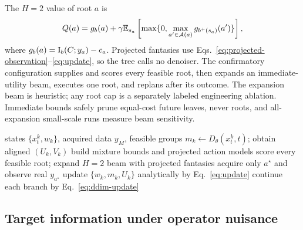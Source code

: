 The $H=2$ value of root $a$ is
\begin{equation}
 Q(a)=g_b(a)+\gamma\mathbb{E}_{s_a}
 \left[\max\{0,\max_{a'\in\mathcal A(a)}g_{b^+(s_a)}(a')\}\right],
 \label{eq:h2}
\end{equation}
where $g_b(a)=\mathrm{I}_b(C;y_a)-c_a$.  Projected fantasies use
Eqs.~\eqref{eq:projected-observation}--\eqref{eq:update}, so the tree calls no
denoiser.  The confirmatory configuration supplies and scores every feasible
root, then expands an immediate-utility beam, executes one root, and replans
after its outcome.  The expansion beam is heuristic; any root cap is a
separately labeled engineering ablation.  Immediate bounds safely prune
equal-cost future leaves, never roots, and all-expansion small-scale runs
measure beam sensitivity.

\begin{algorithm}[t]
\caption{\method{} at one acquisition checkpoint}
\label{alg:raosense}
\begin{algorithmic}[1]\footnotesize
\Require states $\{x_t^k,w_k\}$, acquired data $y_M$, feasible groups
  \State $m_k\gets D_\theta(x_t^k,t)$; obtain aligned $(U_k,V_k)$
\EndFor
\State build mixture bounds and projected action models
\State score every feasible root; expand $H=2$ beam with projected fantasies
\State acquire only $a^\star$ and observe real $y_{a^\star}$
\State update $\{w_k,m_k,U_k\}$ analytically by Eq.~\eqref{eq:update}
\State continue each branch by Eq.~\eqref{eq:ddim-update}
\end{algorithmic}
\end{algorithm}

\subsection{Target information under operator nuisance}
\label{sec:target-information}

